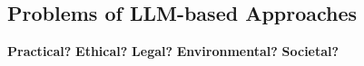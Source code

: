 \subsection{Problems of LLM-based Approaches}
\begin{frame}{\insertsubsection{}}
	\begin{fancycolumns}[animation=none, columns=5]
		\textbf{Practical?}
		\nextcolumn
		\textbf{Ethical?}
		\nextcolumn
		\textbf{Legal?}
		\nextcolumn
		\textbf{Environmental?}
		\nextcolumn
		\textbf{Societal?}
	\end{fancycolumns}
\end{frame}





